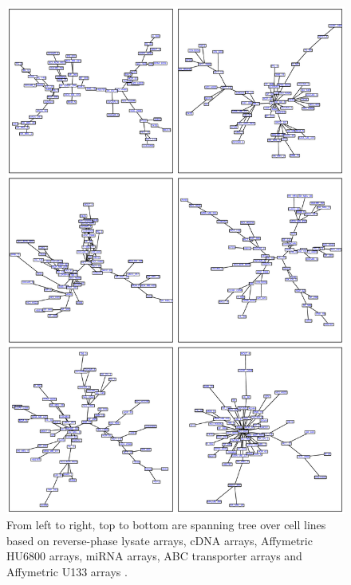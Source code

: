 \documentclass[english]{tktltiki}
\begin{document}
\begin{figure}[t]
\begin{center}
\centering
\includegraphics[width=1.0\columnwidth]{./plots/spanning_tree.pdf}
\caption[Spanning trees over cancer cell lines.]{From left to right, top to bottom are spanning tree over cell lines based on reverse-phase lysate arrays, cDNA arrays, Affymetric HU6800 arrays, miRNA arrays, ABC transporter arrays and Affymetric U133 arrays \cite{shankavaram09}.}
\label{spanning_tree}
\end{center}
\end{figure}
\end{document}
